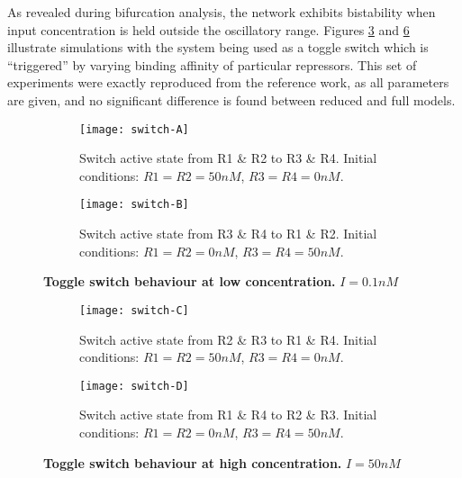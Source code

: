     As revealed during bifurcation analysis, the network exhibits bistability when input concentration is held outside the oscillatory range.
    Figures \ref{fig.switch-low} and \ref{fig.switch-high} illustrate simulations with the system being used as a toggle switch which is ``triggered'' by varying binding affinity of particular repressors.
    This set of experiments were exactly reproduced from the reference work, as all parameters are given, and no significant difference is found between reduced and full models.

    \begin{figure}[!htb]
      \centering
      \begin{subfigure}[t]{0.4\textwidth}
        \centering
        \texttt{[image: switch-A]}
        \caption{Switch active state from R1 \& R2 to R3 \& R4. Initial conditions: $R1 = R2 = 50nM$, $R3 = R4 = 0nM$.}
        \label{fig.switch-A}
      \end{subfigure}
      \hspace{1em}
      \begin{subfigure}[t]{0.4\textwidth}
        \centering
        \texttt{[image: switch-B]}
        \caption{Switch active state from R3 \& R4 to R1 \& R2. Initial conditions: $R1 = R2 = 0nM$, $R3 = R4 = 50nM$.}
        \label{fig.switch-B}
      \end{subfigure}
      \caption{\textbf{Toggle switch behaviour at low concentration.} $I = 0.1 nM$}
      \label{fig.switch-low}
    \end{figure}

    \begin{figure}[!htb]
      \centering
      \begin{subfigure}[t]{0.45\textwidth}
        \centering
        \texttt{[image: switch-C]}
        \caption{Switch active state from R2 \& R3 to R1 \& R4. Initial conditions: $R1 = R2 = 50nM$, $R3 = R4 = 0nM$.}
        \label{fig.switch-C}
      \end{subfigure}
      \hspace{1em}
      \begin{subfigure}[t]{0.45\textwidth}
        \centering
        \texttt{[image: switch-D]}
        \caption{Switch active state from R1 \& R4 to R2 \& R3. Initial conditions: $R1 = R2 = 0nM$, $R3 = R4 = 50nM$.}
        \label{fig.switch-D}
      \end{subfigure}
      \caption{\textbf{Toggle switch behaviour at high concentration.} $I = 50 nM$}
      \label{fig.switch-high}
    \end{figure}


